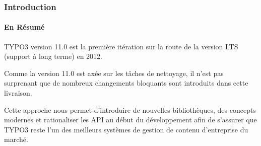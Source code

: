 %

\begin{frame}[fragile]
	\frametitle{Introduction}
	\framesubtitle{En Résumé}

	\small
		TYPO3 version 11.0 est la première itération sur la route de la version LTS
		(support à long terme) en 2012.

		\vspace{0.2cm}

		Comme la version 11.0 est axée sur les tâches de nettoyage, il n'est pas
		surprenant que de nombreux changements bloquants sont introduits dans cette livraison.

		\vspace{0.2cm}

		Cette approche nous permet d'introduire de nouvelles bibliothèques, des concepts
		modernes et rationaliser les API au début du développement afin de s'assurer que
		TYPO3 reste l'un des meilleurs systèmes de gestion de contenu d'entreprise du marché.

		\vspace{0.2cm}

	\normalsize

\end{frame}

